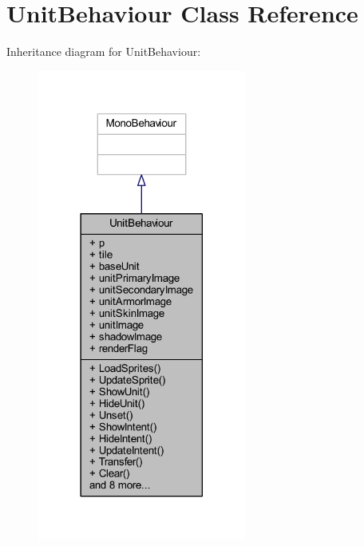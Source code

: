 \hypertarget{class_unit_behaviour}{}\section{Unit\+Behaviour Class Reference}
\label{class_unit_behaviour}


Inheritance diagram for Unit\+Behaviour\+:\nopagebreak
\begin{figure}[H]
\begin{center}
\leavevmode
\includegraphics[width=194pt]{class_unit_behaviour__inherit__graph}
\end{center}
\end{figure}


